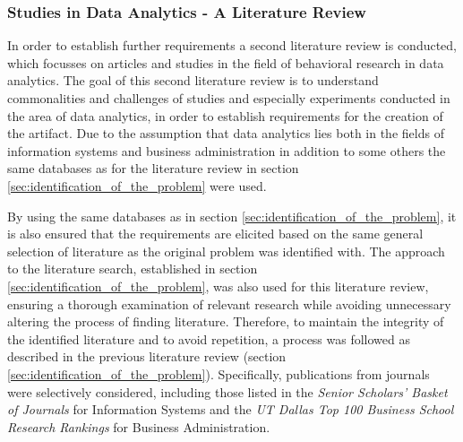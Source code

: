 \subsubsection{Studies in Data Analytics - A Literature Review }\label{subsec:literature_review_requirements}

In order to establish further requirements a second literature review is conducted, which focusses on articles and studies in the field of behavioral research in data analytics. The goal of this second literature review is to understand commonalities and challenges of studies and especially experiments conducted in the area of data analytics, in order to establish requirements for the creation of the artifact. Due to the assumption that data analytics lies both in the fields of information systems and business administration in addition to some others the same databases as for the literature review in section \ref{sec:identification_of_the_problem} were used.

By using the same databases as in section \ref{sec:identification_of_the_problem}, it is also ensured that the requirements are elicited based on the same general selection of literature as the original problem was identified with. The approach to the literature search, established in section \ref{sec:identification_of_the_problem}, was also used for this literature review, ensuring a thorough examination of relevant research while avoiding unnecessary altering the process of finding literature. Therefore, to maintain the integrity of the identified literature and to avoid repetition, a process was followed as described in the previous literature review (section \ref{sec:identification_of_the_problem}). Specifically, publications from journals were selectively considered, including those listed in the \textit{Senior Scholars' Basket of Journals} for Information Systems and the \textit{UT Dallas Top 100 Business School Research Rankings} for Business Administration. 

